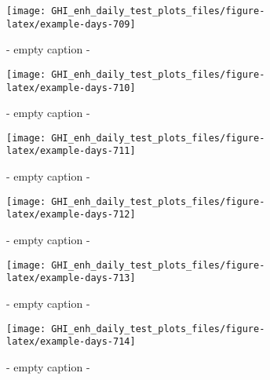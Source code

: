 \documentclass[
  10pt,
  a4paper,oneside]{article}
\begin{document}
\begin{figure}[H]

{\centering \texttt{[image: GHI\_enh\_daily\_test\_plots\_files/figure-latex/example-days-709]} 

}

\caption{ - empty caption - }\label{fig:example-days-709}
\end{figure}

\begin{figure}[H]

{\centering \texttt{[image: GHI\_enh\_daily\_test\_plots\_files/figure-latex/example-days-710]} 

}

\caption{ - empty caption - }\label{fig:example-days-710}
\end{figure}

\begin{figure}[H]

{\centering \texttt{[image: GHI\_enh\_daily\_test\_plots\_files/figure-latex/example-days-711]} 

}

\caption{ - empty caption - }\label{fig:example-days-711}
\end{figure}

\begin{figure}[H]

{\centering \texttt{[image: GHI\_enh\_daily\_test\_plots\_files/figure-latex/example-days-712]} 

}

\caption{ - empty caption - }\label{fig:example-days-712}
\end{figure}

\begin{figure}[H]

{\centering \texttt{[image: GHI\_enh\_daily\_test\_plots\_files/figure-latex/example-days-713]} 

}

\caption{ - empty caption - }\label{fig:example-days-713}
\end{figure}

\begin{figure}[H]

{\centering \texttt{[image: GHI\_enh\_daily\_test\_plots\_files/figure-latex/example-days-714]} 

}

\caption{ - empty caption - }\label{fig:example-days-714}
\end{figure}
\end{document}
